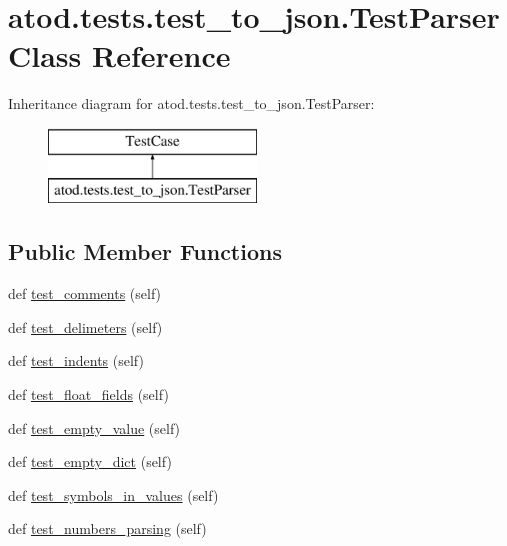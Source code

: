 \hypertarget{classatod_1_1tests_1_1test__to__json_1_1_test_parser}{}\section{atod.\+tests.\+test\+\_\+to\+\_\+json.\+Test\+Parser Class Reference}
\label{classatod_1_1tests_1_1test__to__json_1_1_test_parser}
Inheritance diagram for atod.\+tests.\+test\+\_\+to\+\_\+json.\+Test\+Parser\+:\begin{figure}[H]
\begin{center}
\leavevmode
\includegraphics[height=2.000000cm]{classatod_1_1tests_1_1test__to__json_1_1_test_parser}
\end{center}
\end{figure}
\subsection*{Public Member Functions}
\begin{DoxyCompactItemize}
\item 
def \hyperlink{classatod_1_1tests_1_1test__to__json_1_1_test_parser_a3e0669b48f2fa92cf36ea7cfc283e552}{test\+\_\+comments} (self)
\item 
def \hyperlink{classatod_1_1tests_1_1test__to__json_1_1_test_parser_ae2fb42ee0ee03b5a77b0f4866120cadb}{test\+\_\+delimeters} (self)
\item 
def \hyperlink{classatod_1_1tests_1_1test__to__json_1_1_test_parser_a05a70c28fa37bb525f3f3632fe319a66}{test\+\_\+indents} (self)
\item 
def \hyperlink{classatod_1_1tests_1_1test__to__json_1_1_test_parser_aaba2235be015df76c927d18c3ce65c66}{test\+\_\+float\+\_\+fields} (self)
\item 
def \hyperlink{classatod_1_1tests_1_1test__to__json_1_1_test_parser_a38f5e65973a9b0d127b31e61fab9b6ba}{test\+\_\+empty\+\_\+value} (self)
\item 
def \hyperlink{classatod_1_1tests_1_1test__to__json_1_1_test_parser_a9e4bd96b1e5a29b91b154c4a6a2eb2fc}{test\+\_\+empty\+\_\+dict} (self)
\item 
def \hyperlink{classatod_1_1tests_1_1test__to__json_1_1_test_parser_accbb34848f3e273e3f67dffe0af6f736}{test\+\_\+symbols\+\_\+in\+\_\+values} (self)
\item 
def \hyperlink{classatod_1_1tests_1_1test__to__json_1_1_test_parser_a7cb67a3ebadc141b1fc490795ba49dee}{test\+\_\+numbers\+\_\+parsing} (self)
\end{DoxyCompactItemize}


